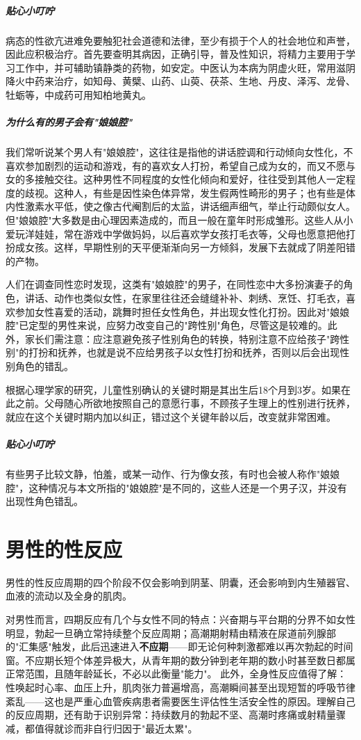 \subparagraph{贴心小叮咛}

病态的性欲亢进难免要触犯社会道德和法律，至少有损于个人的社会地位和声誉，因此应积极治疗。首先要查明其病因，正确引导，普及性知识，将精力主要用于学习工作中，并可辅助镇静类的药物，如安定。中医认为本病为阴虚火旺，常用滋阴降火中药来治疗，如知母、黄檗、山药、山萸、茯茶、生地、丹皮、泽泻、龙骨、牡蛎等，中成药可用知柏地黄丸。

\subparagraph{为什么有的男子会有"娘娘腔"}

我们常听说某个男人有"娘娘腔"，这往往是指他的讲话腔调和行动倾向女性化，不喜欢参加剧烈的运动和游戏，有的喜欢女人打扮，希望自己成为女的，而又不愿与女的多接触交往。这种男性不同程度的女性化倾向和爱好，往往受到其他人一定程度的歧视。这种人，有些是因性染色体异常，发生假两性畸形的男子；也有些是体内性激素水平低，使之像古代阉割后的太监，讲话细声细气，举止行动颇似女人。但"娘娘腔"大多数是由心理因素造成的，而且一般在童年时形成雏形。这些人从小爱玩洋娃娃，常在游戏中学做妈妈，以后喜欢学女孩打毛衣等，父母也愿意把他打扮成女孩。这样，早期性别的天平便渐渐向另一方倾斜，发展下去就成了阴差阳错的产物。

人们在调查同性恋时发现，这类有"娘娘腔"的男子，在同性恋中大多扮演妻子的角色，讲话、动作也类似女性，在家里往往还会缝缝补补、刺绣、烹饪、打毛衣，喜欢参加女性喜爱的活动，跳舞时担任女性角色，并出现女性化打扮。因此对"娘娘腔"已定型的男性来说，应努力改变自己的"跨性别"角色，尽管这是较难的。此外，家长们需注意：应注意避免孩子性别角色的转换，特别注意不应给孩子"跨性别"的打扮和抚养，也就是说不应给男孩子以女性打扮和抚养，否则以后会出现性别角色的错乱。

根据心理学家的研究，儿童性别确认的关键时期是其出生后18个月到3岁。如果在此之前。父母随心所欲地按照自己的意愿行事，不顾孩子生理上的性别进行抚养，就应在这个关键时期内加以纠正，错过这个关键年龄以后，改变就非常困难。

\subparagraph{贴心小叮咛}

有些男子比较文静，怕羞，或某一动作、行为像女孩，有时也会被人称作"娘娘腔"，这种情况与本文所指的"娘娘腔"是不同的，这些人还是一个男子汉，并没有出现性角色错乱。

\section{男性的性反应}

男性的性反应周期的四个阶段不仅会影响到阴茎、阴囊，还会影响到内生殖器官、血液的流动以及全身的肌肉。


对男性而言，四期反应有几个与女性不同的特点：兴奋期与平台期的分界不如女性明显，勃起一旦确立常持续整个反应周期；高潮期射精由精液在尿道前列腺部的"汇集感"触发，此后迅速进入\textbf{不应期}——即无论何种刺激都难以再次勃起的时间窗。不应期长短个体差异极大，从青年期的数分钟到老年期的数小时甚至数日都属正常范围，且随年龄延长，不必以此衡量"能力"。
此外，全身性反应值得了解：性唤起时心率、血压上升，肌肉张力普遍增高，高潮瞬间甚至出现短暂的呼吸节律紊乱——这也是严重心血管疾病患者需要医生评估性生活安全性的原因。理解自己的反应周期，还有助于识别异常：持续数月的勃起不坚、高潮时疼痛或射精量骤减，都值得就诊而非自行归因于"最近太累"。

